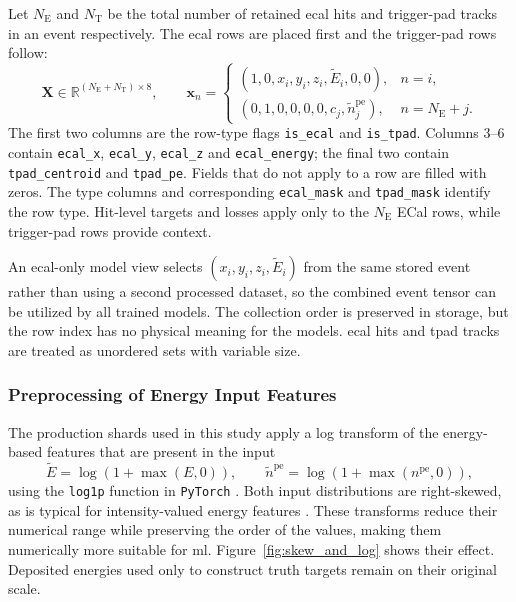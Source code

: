 Let \(N_{\mathrm{E}}\) and \(N_{\mathrm{T}}\) be the total number of retained
\gls{ecal} hits and trigger-pad tracks in an event respectively. The \gls{ecal} rows are placed
first and the trigger-pad rows follow:
\begin{equation}
    \mathbf{X}
    \in
    \mathbb{R}^{(N_{\mathrm{E}}+N_{\mathrm{T}})\times 8},
    \qquad
    \mathbf{x}_n =
    \begin{cases}
        (1,0,x_i,y_i,z_i,\widetilde{E}_i,0,0),
        & n=i, \\[2mm]
        (0,1,0,0,0,0,c_j,\widetilde{n}^{\mathrm{pe}}_j),
        & n=N_{\mathrm{E}}+j .
    \end{cases}
    \label{eq:combined_event_tensor}
\end{equation}
The first two columns are the row-type flags \texttt{is\_ecal} and
\texttt{is\_tpad}. Columns 3--6 contain \texttt{ecal\_x},
\texttt{ecal\_y}, \texttt{ecal\_z} and \texttt{ecal\_energy}; the final two
contain \texttt{tpad\_centroid} and \texttt{tpad\_pe}. Fields that do not
apply to a row are filled with zeros. The type columns and corresponding
\texttt{ecal\_mask} and \texttt{tpad\_mask} identify the row type. Hit-level
targets and losses apply only to the \(N_{\mathrm{E}}\) ECal rows, while
trigger-pad rows provide context.

An \gls{ecal}-only model view selects
\((x_i,y_i,z_i,\widetilde{E}_i)\) from the same stored event rather than
using a second processed dataset, so the combined event tensor can be utilized by all trained models. The collection order is preserved in
storage, but the row index has no physical meaning for the models. \gls{ecal} hits
and \gls{tpad} tracks are treated as unordered sets with variable size.

\subsubsection{Preprocessing of Energy Input Features}
\label{sec:preprocess}

The production shards used in this study apply a log transform of the energy-based features that are present in the input
\begin{equation}
    \widetilde{E}
    = \log\!\left(1+\max(E,0)\right),
    \qquad
    \widetilde{n}^{\mathrm{pe}}
    = \log\!\left(1+\max(n^{\mathrm{pe}},0)\right),
    \label{eq:input_log_transforms}
\end{equation}
using the \texttt{log1p} function in \texttt{PyTorch}
\cite{pytorch_log1p}. Both input distributions are right-skewed, as is typical
for intensity-valued energy features \cite{lai2024shower}. These
transforms reduce their numerical range while preserving the order of the
values, making them numerically more suitable for \gls{ml}.
Figure~\ref{fig:skew_and_log} shows their effect. Deposited energies used only
to construct truth targets remain on their original scale.


